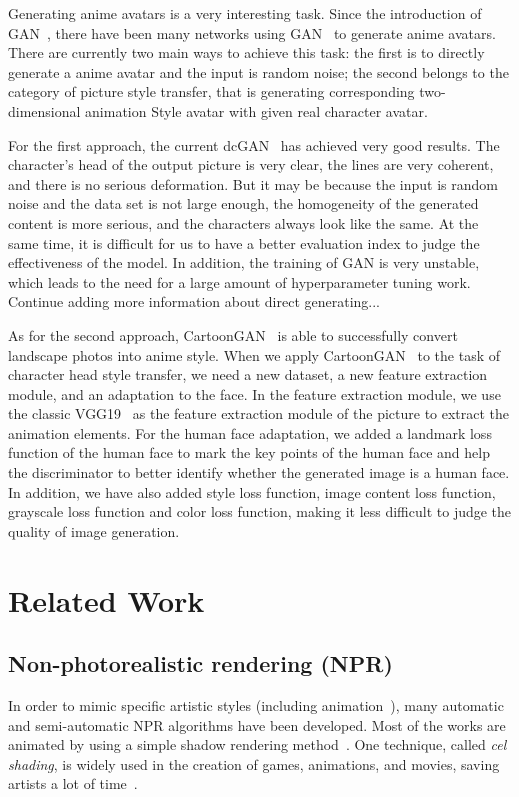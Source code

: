 \documentclass[10pt,twocolumn,letterpaper]{article}
\begin{document}
Generating anime avatars is a very interesting task. Since the introduction of GAN~\cite{GAN},
there have been many networks using GAN~\cite{GAN} to generate anime avatars. There are currently
two main ways to achieve this task: the first is to directly generate a anime avatar
and the input is random noise; the second belongs to the category of picture style
transfer, that is generating corresponding two-dimensional animation Style avatar with given real
character avatar.

For the first approach, the current dcGAN~\cite{dcGAN} has achieved very good results.
The character's head of the output picture is very clear, the lines are very coherent, and there
is no serious deformation. But it may be because the input is random noise and the data
set is not large enough, the homogeneity of the generated content is more serious, and the
characters always look like the same. At the same time, it is difficult for us to have a better
evaluation index to judge the effectiveness of the model. In addition, the training of GAN
is very unstable, which leads to the need for a large amount of hyperparameter tuning work.
{\color{red}Continue adding more information about direct generating...}

As for the second approach, CartoonGAN~\cite{CartoonGAN} is able to successfully convert landscape photos
into anime style. When we apply CartoonGAN~\cite{CartoonGAN} to the task of character head style transfer,
we need a new dataset, a new feature extraction module, and an adaptation to the face.
In the feature extraction module, we use the classic VGG19~\cite{VGG} as the feature extraction
module of the picture to extract the animation elements. For the human face adaptation,
we added a landmark loss function of the human face to mark the key points of the human face and
help the discriminator to better identify whether the generated image is a human face. In addition,
we have also added style loss function, image content loss function,
grayscale loss function and color loss function, making it less difficult to
judge the quality of image generation.

\section{Related Work}

\subsection{Non-photorealistic rendering (NPR)}
In order to mimic specific artistic styles (including animation~\cite{rosin2012image}), many automatic and
semi-automatic NPR algorithms have been developed. Most of the works are animated by
using a simple shadow rendering method~\cite{saito1990comprehensible}. One technique, called  \textsl{cel shading}, is widely
used in the creation of games, animations, and movies, saving artists a lot of time~\cite{luque2012cel}.
\end{document}
